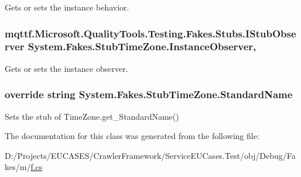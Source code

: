 Gets or sets the instance behavior.

\hypertarget{class_system_1_1_fakes_1_1_stub_time_zone_a4caca0956e2d413d683526a32f233a9b}{
\subsubsection[{Instance\-Observer}]{\setlength{\rightskip}{0pt plus 5cm}mqttf.\-Microsoft.\-Quality\-Tools.\-Testing.\-Fakes.\-Stubs.\-I\-Stub\-Observer System.\-Fakes.\-Stub\-Time\-Zone.\-Instance\-Observer\hspace{0.3cm}{\ttfamily [get]}, {\ttfamily [set]}}}\label{class_system_1_1_fakes_1_1_stub_time_zone_a4caca0956e2d413d683526a32f233a9b}


Gets or sets the instance observer.

\hypertarget{class_system_1_1_fakes_1_1_stub_time_zone_af3982f7703ce5d7650a9550c55bc21c0}{
\subsubsection[{Standard\-Name}]{\setlength{\rightskip}{0pt plus 5cm}override string System.\-Fakes.\-Stub\-Time\-Zone.\-Standard\-Name\hspace{0.3cm}{\ttfamily [get]}}}\label{class_system_1_1_fakes_1_1_stub_time_zone_af3982f7703ce5d7650a9550c55bc21c0}


Sets the stub of Time\-Zone.\-get\-\_\-\-Standard\-Name()



The documentation for this class was generated from the following file\-:\begin{DoxyCompactItemize}
\item 
D\-:/\-Projects/\-E\-U\-C\-A\-S\-E\-S/\-Crawler\-Framework/\-Service\-E\-U\-Cases.\-Test/obj/\-Debug/\-Fakes/m/\hyperlink{m_2f_8cs}{f.\-cs}\end{DoxyCompactItemize}
